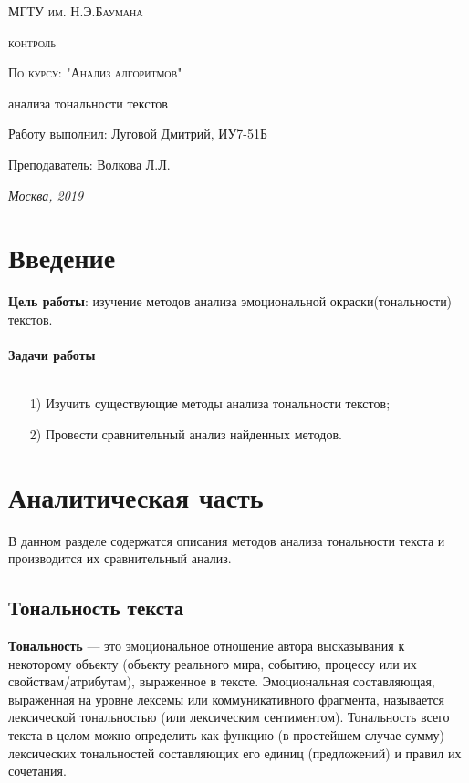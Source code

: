 \documentclass[a4paper,12pt]{report}
\begin{document}
\begin{titlepage}
	\centering
	{\scshape\LARGE МГТУ им. Н.Э.Баумана \par}
	\vspace{4cm}
	{\scshape{} контроль\par}
	\vspace{0.5cm}	
	{\scshape\Large По курсу: "Анализ алгоритмов"\par}
	\vspace{2cm}
	{\huge{} анализа тональности текстов\par}
	\vspace{3cm}
	\Large Работу выполнил: Луговой Дмитрий, ИУ7-51Б\par
	\vspace{0.5cm}
	\Large Преподаватель:  Волкова Л.Л.\par

	\vfill
	\large \textit {Москва, 2019} \par
\end{titlepage}

\setcounter{page}{2}

\tableofcontents

\newpage
\chapter*{Введение}
\hspace{0.6cm} \textbf{Цель работы}: изучение методов анализа эмоциональной окраски(тональности) текстов.\\\\

\textbf{\LARGE Задачи работы}\\\\
\begin{enumerate}
\item[1)] Изучить существующие методы анализа тональности текстов;
\item[2)] Провести сравнительный анализ найденных методов.
\end{enumerate}

\chapter{Аналитическая часть}
\hspace{0.6cm}В данном разделе содержатся описания методов анализа тональности текста и производится их сравнительный анализ.

\section{Тональность текста}
\hspace{0.6cm}\textbf{Тональность} — это эмоциональное отношение автора высказывания к некоторому объекту (объекту реального мира, событию, процессу или их свойствам/атрибутам), выраженное в тексте. Эмоциональная составляющая, выраженная на уровне лексемы или коммуникативного фрагмента, называется лексической тональностью (или лексическим сентиментом). Тональность всего текста в целом можно определить как функцию (в простейшем случае сумму) лексических тональностей составляющих его единиц (предложений) и правил их сочетания.
\end{document}
